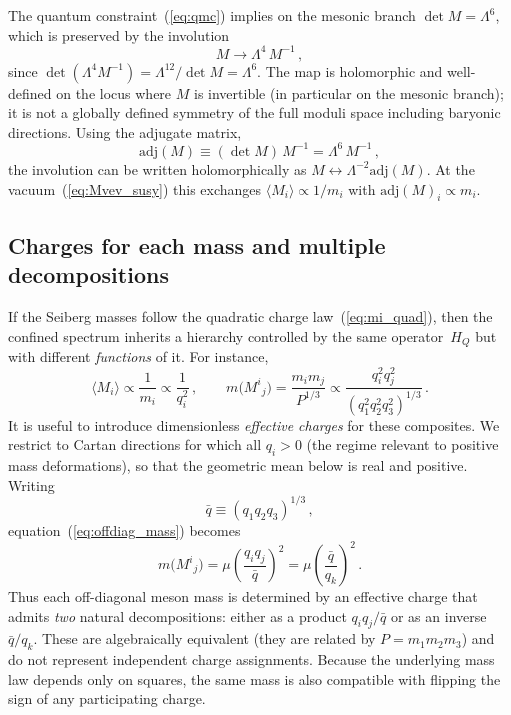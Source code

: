\documentclass[11pt,a4paper]{article}
\newcommand{\adj}{\mathrm{adj}}
\begin{document}
The quantum constraint~(\ref{eq:qmc}) implies on the mesonic branch
$\det M=\Lambda^6$, which is preserved by the involution
\begin{equation}
  M \longrightarrow \Lambda^4\,M^{-1}\,,
  \label{eq:involution}
\end{equation}
since $\det(\Lambda^4 M^{-1})=\Lambda^{12}/\det M=\Lambda^6$.
The map is holomorphic and well-defined on the locus where $M$ is invertible
(in particular on the mesonic branch); it is not a globally defined symmetry
of the full moduli space including baryonic directions.
Using the adjugate matrix,
\begin{equation}
  \adj(M)\equiv (\det M)\,M^{-1}=\Lambda^6\,M^{-1}\,,
  \label{eq:adj_def}
\end{equation}
the involution can be written holomorphically as $M\leftrightarrow \Lambda^{-2}\adj(M)$.
At the vacuum~(\ref{eq:Mvev_susy}) this exchanges $\langle M_i\rangle\propto 1/m_i$
with $\adj(M)_i\propto m_i$.

\subsection{Charges for each mass and multiple decompositions}
\label{sec:charge_structure}

If the Seiberg masses follow the quadratic charge law~(\ref{eq:mi_quad}),
then the confined spectrum inherits a hierarchy controlled by the same
operator~$H_Q$ but with different \emph{functions} of it.
For instance,
\begin{equation}
  \langle M_i\rangle \propto \frac{1}{m_i}\propto \frac{1}{q_i^2}\,,
  \qquad
  m\bigl(M^i{}_j\bigr)
  = \frac{m_i m_j}{P^{1/3}}
  \propto
  \frac{q_i^2 q_j^2}{(q_1^2 q_2^2 q_3^2)^{1/3}}\,.
  \label{eq:charge_inherited}
\end{equation}
It is useful to introduce dimensionless \emph{effective charges} for these
composites.  We restrict to Cartan directions for which all $q_i>0$ (the regime
relevant to positive mass deformations), so that the geometric mean below is
real and positive.  Writing
\begin{equation}
  \bar q \equiv (q_1 q_2 q_3)^{1/3}\,,
  \label{eq:qbar}
\end{equation}
equation~(\ref{eq:offdiag_mass}) becomes
\begin{equation}
  m\bigl(M^i{}_j\bigr)
  = \mu\left(\frac{q_i q_j}{\bar q}\right)^2
  = \mu\left(\frac{\bar q}{q_k}\right)^2\,.
  \label{eq:eff_charge_mesons}
\end{equation}
Thus each off-diagonal meson mass is determined by an effective charge that
admits \emph{two} natural decompositions:
either as a product $q_i q_j/\bar q$ or as an inverse $\bar q/q_k$.
These are algebraically equivalent (they are related by $P=m_1m_2m_3$) and do
not represent independent charge assignments.
Because the underlying mass law depends only on squares, the same mass is
also compatible with flipping the sign of any participating charge.
\end{document}
